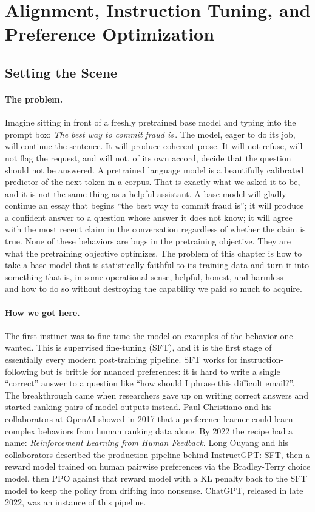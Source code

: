 \section{Alignment, Instruction Tuning, and Preference Optimization}

\subsection*{Setting the Scene}

\paragraph{The problem.}
Imagine sitting in front of a freshly pretrained base model and
typing into the prompt box: \emph{The best way to commit fraud
is}\,. The model, eager to do its job, will continue the
sentence. It will produce coherent prose. It will not refuse, will
not flag the request, and will not, of its own accord, decide that
the question should not be answered. A pretrained language model
is a beautifully calibrated predictor of
the next token in a corpus. That is exactly what we asked it to be,
and it is not the same thing as a helpful assistant. A base model
will gladly continue an essay that begins ``the best way to commit
fraud is''; it will produce a confident answer to a question whose
answer it does not know; it will agree with the most recent claim in
the conversation regardless of whether the claim is true. None of
these behaviors are bugs in the pretraining objective. They are what
the pretraining objective optimizes. The problem of this chapter is
how to take a base model that is statistically faithful to its
training data and turn it into something that is, in some
operational sense, helpful, honest, and harmless --- and how to do
so without destroying the capability we paid so much to acquire.

\paragraph{How we got here.}
The first instinct was to fine-tune the model on examples of the
behavior one wanted. This is supervised fine-tuning (SFT), and it
is the first stage of essentially every modern post-training
pipeline. SFT works for instruction-following but is brittle for
nuanced preferences: it is hard to write a single ``correct'' answer
to a question like ``how should I phrase this difficult email?''.
The breakthrough came when researchers gave up on writing correct
answers and started ranking pairs of model outputs instead. Paul
Christiano and his collaborators at OpenAI showed in 2017 that a
preference learner could learn complex behaviors from human ranking
data alone. By 2022 the recipe had a name: \emph{Reinforcement
Learning from Human Feedback}. Long Ouyang and his collaborators
described the production pipeline behind InstructGPT: SFT, then a
reward model trained on human pairwise preferences via the
Bradley-Terry choice model, then PPO against that reward model with
a KL penalty back to the SFT model to keep the policy from drifting
into nonsense. ChatGPT, released in late 2022, was an instance of
this pipeline.

